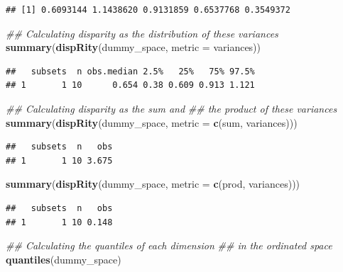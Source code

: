 \documentclass[]{book}
\newenvironment{Shaded}{\begin{snugshade}}{\end{snugshade}}
\newcommand{\CommentTok}[1]{\textcolor[rgb]{0.56,0.35,0.01}{\textit{#1}}}
\newcommand{\DataTypeTok}[1]{\textcolor[rgb]{0.13,0.29,0.53}{#1}}
\newcommand{\KeywordTok}[1]{\textcolor[rgb]{0.13,0.29,0.53}{\textbf{#1}}}
\newcommand{\NormalTok}[1]{#1}
\begin{document}
\begin{verbatim}
## [1] 0.6093144 1.1438620 0.9131859 0.6537768 0.3549372
\end{verbatim}

\begin{Shaded}
\begin{Highlighting}[]
\CommentTok{## Calculating disparity as the distribution of these variances}
\KeywordTok{summary}\NormalTok{(}\KeywordTok{dispRity}\NormalTok{(dummy_space, }\DataTypeTok{metric =}\NormalTok{ variances))}
\end{Highlighting}
\end{Shaded}

\begin{verbatim}
##   subsets  n obs.median 2.5%   25%   75% 97.5%
## 1       1 10      0.654 0.38 0.609 0.913 1.121
\end{verbatim}

\begin{Shaded}
\begin{Highlighting}[]
\CommentTok{## Calculating disparity as the sum and}
\CommentTok{## the product of these variances}
\KeywordTok{summary}\NormalTok{(}\KeywordTok{dispRity}\NormalTok{(dummy_space, }\DataTypeTok{metric =} \KeywordTok{c}\NormalTok{(sum, variances)))}
\end{Highlighting}
\end{Shaded}

\begin{verbatim}
##   subsets  n   obs
## 1       1 10 3.675
\end{verbatim}

\begin{Shaded}
\begin{Highlighting}[]
\KeywordTok{summary}\NormalTok{(}\KeywordTok{dispRity}\NormalTok{(dummy_space, }\DataTypeTok{metric =} \KeywordTok{c}\NormalTok{(prod, variances)))}
\end{Highlighting}
\end{Shaded}

\begin{verbatim}
##   subsets  n   obs
## 1       1 10 0.148
\end{verbatim}

\begin{Shaded}
\begin{Highlighting}[]
\CommentTok{## Calculating the quantiles of each dimension}
\CommentTok{## in the ordinated space}
\KeywordTok{quantiles}\NormalTok{(dummy_space)}
\end{Highlighting}
\end{Shaded}
\end{document}
